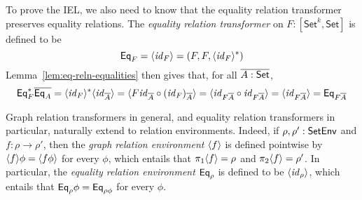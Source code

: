 \documentclass{lmcs}
\theoremstyle{plain}\newtheorem{satz}[thm]{Satz}
\newcommand{\set}{\mathsf{Set}}
\renewcommand{\id}{\mathit{id}}
\begin{document}
{To prove the IEL, we also need to know that the equality relation
transformer preserves equality relations.  The {\em equality relation
  transformer} on $F : [\set^k,\set]$ is defined to be
\begin{equation}\label{def:eq-transf}
  \Eq_F = \graph{\id_{F}} = (F, F, \graph{\id_{F}}^*)
\end{equation}  
Lemma~\ref{lem:eq-reln-equalities} then gives that, for all $\ol{A :
\set}$,
\begin{equation}\label{eq:eq-pres-eq}
\Eq^*_F \ol{\Eq_A}
= \graph{\id_F}^* \graph{\id_{\ol{A}}}
= \graph{F \id_{\ol{A}} \circ (\id_F)_{\ol{A}}}
= \graph{\id_{F\ol{A}} \circ \id_{F\ol{A}}}
= \graph{\id_{F\ol{A}}}
= \Eq_{F\ol{A}}
\end{equation}

Graph relation transformers in general, and equality relation
transformers in particular, naturally extend to relation environments.
Indeed, if $\rho, \rho' : \mathsf{SetEnv}$ and $f : \rho \to \rho'$, then the
{\em graph relation environment} $\langle {f} \rangle$ is defined pointwise by
$\langle {f} \rangle \phi = \langle {f \phi} \rangle$ for every $\phi$, which entails that
$\pi_1 \langle {f} \rangle = \rho$ and $\pi_2 \langle {f} \rangle = \rho'$. In particular,
the {\em equality relation environment} $\mathsf{Eq}_\rho$ is defined to be
$\graph{\id_{\rho}}$, which entails that $\mathsf{Eq}_\rho \phi = \mathsf{Eq}_{\rho
  \phi}$ for every $\phi$.

}
\end{document}
